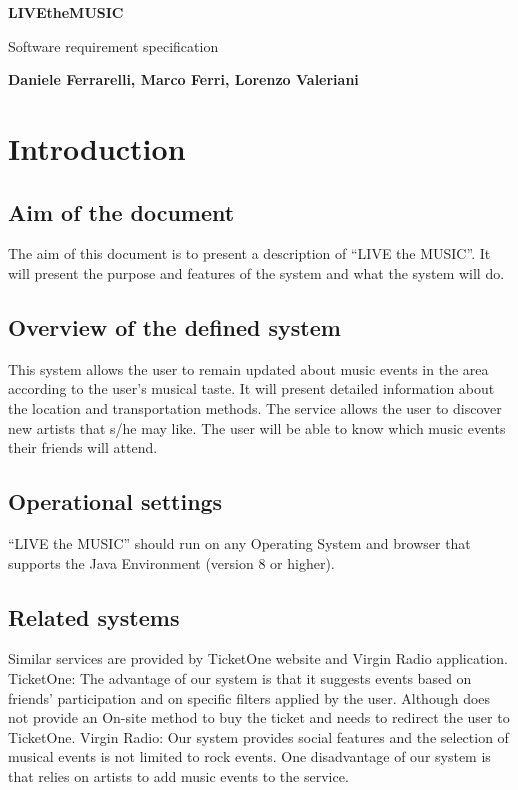 \documentclass[11pt,a4paper]{article}
\begin{document}
\begin{titlepage}
   \begin{center}
       \vspace*{1cm}
 
       \textbf{LIVEtheMUSIC}
 
       \vspace{0.5cm}
        Software requirement specification
 
       \vspace{5cm}
 
       \textbf{Daniele Ferrarelli, Marco Ferri, Lorenzo Valeriani}
 
       \vfill
   \end{center}
\end{titlepage}
\section{Introduction}
\subsection{Aim of the document}
The aim of this document is to present a description of “LIVE the MUSIC”. It will present the purpose and features of the system and what the system will do.
\subsection{Overview of the defined system}
This system allows the user to remain updated about music events in the area according to the user’s musical taste. It will present detailed information about the location and transportation methods. The service allows the user to discover new artists that s/he may like. The user will be able to know which music events their friends will attend.
\subsection{Operational settings}
“LIVE the MUSIC” should run on any Operating System and browser that supports the Java Environment (version 8 or higher). 
\subsection{Related systems}
Similar services are provided by TicketOne website and Virgin Radio application.
TicketOne: 
The advantage of our system is that it suggests events based on friends’ participation and on specific filters applied by the user. Although does not provide an On-site method to buy the ticket and needs to redirect the user to TicketOne. 
Virgin Radio:
Our system provides social features and the selection of musical events is not limited to rock events. One disadvantage of our system is that relies on artists to add music events to the service.
\end{document}
